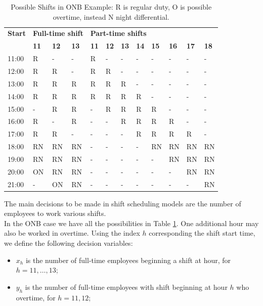\documentclass[a4paper,10 pt,titlepage,twoside]{book}
\theoremstyle{plain}
\theoremstyle{definition}
\theoremstyle{remark}
\begin{document}
{{\begin{table}[]\caption{\label{table:Shiftscheduling2}Possible Shifts in ONB Example: R is regular duty, O is possible overtime, instead N night differential.}
	\begin{center}
	\begin{tabular}{llllllllllll}
		\hline{\textbf{Start}} & \multicolumn{3}{l}{\textbf{Full-time shift}} & \multicolumn{8}{l}{\textbf{Part-time shifts}} \\ \cline{2-12} 
		& \textbf{11} & \textbf{12} & \textbf{13} & \textbf{11} & \textbf{12} & \textbf{13} & \textbf{14} & \textbf{15} & \textbf{16} & \textbf{17} & \textbf{18} \\ \hline
		11:00 & R & - & - & R & - & - & - & - & - & - & - \\
		12:00 & R & R & - & R & R & - & - & - & - & - & - \\
		13:00 & R & R & R & R & R & R & - & - & - & - & - \\
		14:00 & R & R & R & R & R & R & R & - & - & - & - \\
		15:00 & - & R & R & - & R & R & R & R & - & - & - \\
		16:00 & R & - & R & - & - & R & R & R & R & - & - \\
		17:00 & R & R & - & - & - & - & R & R & R & R & - \\
		18:00 & RN & RN & RN & - & - & - & - & RN & RN & RN & RN \\
		19:00 & RN & RN & RN & - & - & - & - & - & RN & RN & RN \\
		20:00 & ON & RN & RN & - & - & - & - & - & - & RN & RN \\
		21:00 & - & ON & RN & - & - & - & - & - & - & - & RN \\ \hline
	\end{tabular}
	\end{center}
\end{table}
The main decisions to be made in shift scheduling models are the number of employees to work various shifts. \\In the ONB case we have all the possibilities in Table \ref{table:Shiftscheduling2}. One additional hour may also be worked in overtime.
Using the index $h$ corresponding the shift start time, we define the following decision variables:
\begin{itemize}
	\item $x_{h}$ is the number of full-time employees beginning a shift at hour, for $h =11, \dots, 13$;
	\item $y_{h}$ is the number of full-time employees with shift beginning at hour $h$ who overtime, for $h=11, 12$;

\end{itemize}}}
\end{document}
